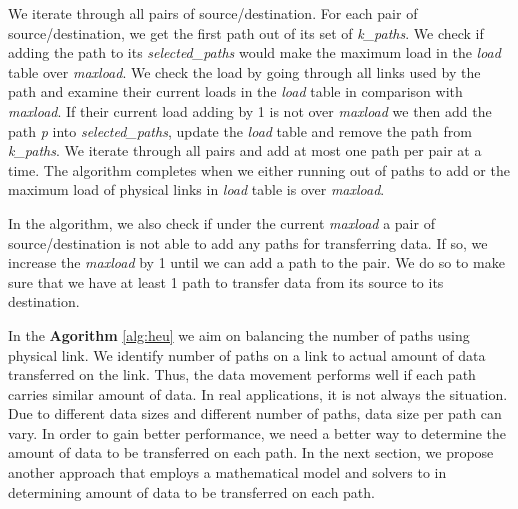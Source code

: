 We iterate through all pairs of source/destination. For each pair of source/destination, we get the first path out of its set of \textit{k\_paths}. We check if adding the path to its \textit{selected\_paths} would make the maximum load in the \textit{load} table over \textit{maxload}. We check the load by going through all links used by the path and examine their current loads in the \textit{load} table in comparison with \textit{maxload}. If their current load adding by 1 is not over \textit{maxload} we then add the path \textit{p} into \textit{selected\_paths}, update the \textit{load} table and remove the path from \textit{k\_paths}. We iterate through all pairs and add at most one path per pair at a time. The algorithm completes when we either running out of paths to add or the maximum load of physical links in \textit{load} table is over \textit{maxload}.

In the algorithm, we also check if under the current \textit{maxload} a pair of source/destination is not able to add any paths for transferring data. If so, we increase the \textit{maxload} by 1 until we can add a path to the pair. We do so to make sure that we have at least 1 path to transfer data from its source to its destination.

In the \textbf{Agorithm} \ref{alg:heu} we aim on balancing the number of paths using physical link. We identify number of paths on a link to actual amount of data transferred on the link.  Thus, the data movement performs well if each path carries similar amount of data. In real applications, it is not always the situation. Due to different data sizes and different number of paths, data size per path can vary. In order to gain better performance, we need a better way to determine the amount of data to be transferred on each path. In the next section, we propose another approach that employs a mathematical model and solvers to in determining  amount of data to be transferred on each path.
